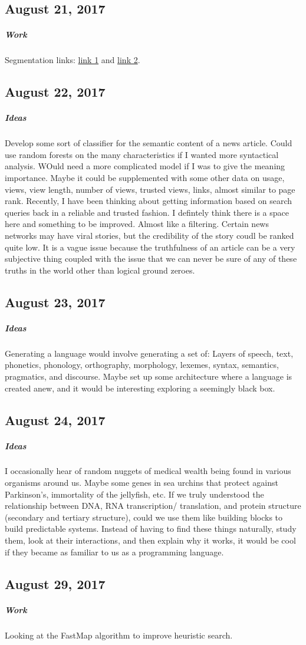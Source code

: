 \documentclass[a4paper]{article}
\begin{document}
\subsection{August 21, 2017}
\subparagraph{Work}
Segmentation links: \href{https://github.com/vuptran/cardiac-segmentation}{link 1} and \href{https://github.com/naldeborgh7575/brain_segmentation}{link 2}.

\subsection{August 22, 2017}
\subparagraph{Ideas}
Develop some sort of classifier for the semantic content of a news article. Could use random forests on the many characteristics if I wanted more syntactical analysis. WOuld need a more complicated model if I was to give the meaning importance. Maybe it could be supplemented with some other data on usage, views, view length, number of views, trusted views, links, almost similar to page rank.
Recently, I have been thinking about getting information based on search queries back in a reliable and trusted fashion. I defintely think there is a space here and something to be improved. Almost like a filtering. Certain news networks may have viral stories, but the credibility of the story coudl be ranked quite low. It is a vague issue because the truthfulness of an article can be a very subjective thing coupled with the issue that we can never be sure of any of these truths in the world other than logical ground zeroes.

\subsection{August 23, 2017}
\subparagraph{Ideas}
Generating a language would involve generating a set of: Layers of speech, text, phonetics, phonology, orthography, morphology, lexemes, syntax, semantics, pragmatics, and discourse. Maybe set up some architecture where a language is created anew, and it would be interesting exploring a seemingly black box.

\subsection{August 24, 2017}
\subparagraph{Ideas}
I occasionally hear of random nuggets of medical wealth being found in various organisms around us. Maybe some genes in sea urchins that protect against Parkinson's, immortality of the jellyfish, etc. If we truly understood the relationship between DNA, RNA transcription/ translation, and protein structure (secondary and tertiary structure), could we use them like building blocks to build predictable systems. Instead of having to find these things naturally, study them, look at their interactions, and then explain why it works, it would be cool if they became as familiar to us as a programming language.

\subsection{August 29, 2017}
\subparagraph{Work}
Looking at the FastMap algorithm to improve heuristic search.
\end{document}
